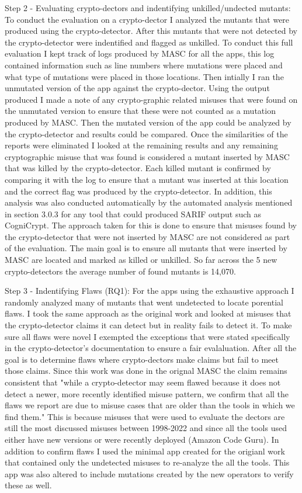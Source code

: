 Step 2 - Evaluating crypto-dectors and indentifying unkilled/undected mutants: To conduct the evaluation on a crypto-dector I analyzed the mutants that were produced using the crypto-detector. After this mutants that were not detected by the crypto-detector were indentified and flagged as unkilled. To conduct this full evaluation I kept track of logs produced by MASC for all the apps, this log contained information such as line numbers where mutations were placed and what type of mutations were placed in those locations. Then intially I ran the unmutated version of the app against the crypto-dector. Using the output produced I made a note of any crypto-graphic related misuses that were found on the unmutated version to ensure that these were not counted as a mutation produced by MASC. Then the mutated version of the app could be analyzed by the crypto-detector and results could be compared. Once the similarities of the reports were eliminated I looked at the remaining results and any remaining cryptographic misuse that was found is considered a mutant inserted by MASC that was killed by the crypto-detector. Each killed mutant is confirmed by comparing it with the log to ensure that a mutant was inserted at this location and the correct flag was produced by the crypto-detector. In addition, this analysis was also conducted automatically by the automated analysis mentioned in section 3.0.3 for any tool that could produced SARIF output such as CogniCrypt. The approach taken for this is done to ensure that misuses found by the crypto-detector that were not inserted by MASC are not considered as part of the evaluation. The main goal is to ensure all mutants that were inserted by MASC are located and marked as killed or unkilled. So far across the 5 new crypto-detectors the average number of found mutants is 14,070.

Step 3 - Indentifying Flaws (RQ1): For the apps using the exhaustive approach I randomly analyzed many of mutants that went undetected to locate porential flaws. I took the same approach as the original work and looked at misuses that the crypto-detector claims it can detect but in reality fails to detect it. To make sure all flaws were novel I exempted the exceptions that were stated specifically in the crypto-detector's documentation to ensure a fair evalaluation. After all the goal is to determine flaws where crypto-dectors make claims but fail to meet those claims. Since this work was done in the orignal MASC the claim remains consistent that "while a crypto-detector may seem flawed because it does not detect a newer, more recently identified misuse pattern, we confirm that all the flaws we report are due to misuse cases that are older than the tools in which we find them." This is because misuses that were used to evaluate the dectors are still the most discussed misuses between 1998-2022 and since all the tools used either have new versions or were recently deployed (Amazon Code Guru). In addition to confirm flaws I used the minimal app created for the origianl work that contained only the undetected misuses to re-analyze the all the tools. This app was also altered to include mutations created by the new operators to verify these as well.

